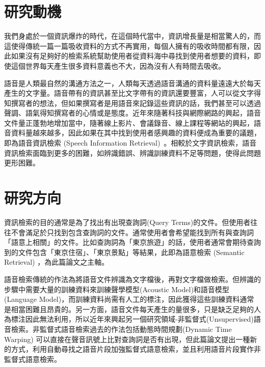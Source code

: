 \section{研究動機}
我們身處於一個資訊爆炸的時代，在這個時代當中，資訊增長量是相當驚人的，而這使得傳統一篇一篇吸收資料的方式不再實用，每個人擁有的吸收時間都有限，因此如果沒有足夠好的檢索系統幫助使用者從資料海中尋找到使用者想要的資料，即使這個世界每天產生很多資料意義也不大，因為沒有人有時間去吸收。

語音是人類最自然的溝通方法之一，人類每天透過語音溝通的資料量遠遠大於每天產生的文字量。語音帶有的資訊甚至比文字帶有的資訊還要豐富，人可以從文字得知撰寫者的想法，但如果撰寫者是用語音來記錄這些資訊的話，我們甚至可以透過聲調、語氣得知撰寫者的心情或是態度。近年來隨著科技與網際網路的興起，語音文件量正蓬勃地增加當中，隨著線上影片、會議錄音、線上課程等網站的興起，語音資料量越來越多，因此如果在其中找到使用者感興趣的資料便成為重要的議題，即為語音資訊檢索 (Speech Information
Retrieval)~\cite{chelba2008retrieval, lee2005spoken}。相較於文字資訊檢索，語音資訊檢索面臨到更多的困難，如辨識錯誤、辨識訓練資料不足等問題，使得此問題更形困難。


\section{研究方向}
資訊檢索的目的通常是為了找出有出現查詢詞(Query Terms)的文件。但使用者往往不會滿足於只找到包含查詢詞的文件。通常使用者會希望能找到所有與查詢詞「語意上相關」的文件。比如查詢詞為「東京旅遊」的話，使用者通常會期待查詢到的文件包含「東京住宿」、「東京景點」等結果，此即為語意檢索 (Semantic Retrieval) ，為此篇論文之主軸。

語音檢索傳統的作法為將語音文件辨識為文字檔後，再對文字檔做檢索。但辨識的步驟中需要大量的訓練資料來訓練聲學模型(Acoustic Model)和語音模型(Language Model)，而訓練資料尚需有人工的標注，因此獲得這些訓練資料通常是相當困難且昂貴的。另一方面，語音文件每天產生的量很多，只是缺乏足夠的人為標注因此無法利用，所以近年來興起另一個研究領域-非監督式(Unsupervised)語音檢索。非監督式語音檢索過去的作法包括動態時間規劃(Dynamic Time Warping)
可以直接在聲音訊號上比對查詢詞是否有出現，但此篇論文提出一種新的方式，利用自動尋找之語音片段加強監督式語意檢索，並且利用語音片段實作非監督式語意檢索。

    

